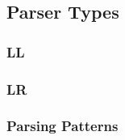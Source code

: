 \documentclass[../InterneDSLs.tex]{subfiles}
\begin{document}
\subsection{Parser Types}


\subsubsection{LL}


\subsubsection{LR}


\subsubsection{Parsing Patterns}
\end{document}
